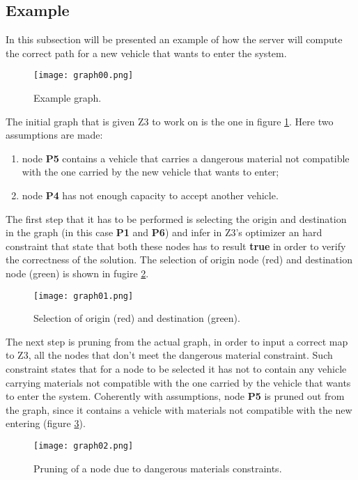 \subsection{Example}
In this subsection will be presented an example of how the server will compute the correct path for a new vehicle that wants to enter the system.
\begin{figure}[!htb]
   \centering
   \texttt{[image: graph00.png]}
   \caption{Example graph.}\label{Fig:Graph00}
\end{figure}
The initial graph that is given Z3 to work on is the one in figure \ref{Fig:Graph00}. Here two assumptions are made:
\begin{enumerate}
  \item node \textbf{P5} contains a vehicle that carries a dangerous material not compatible with the one carried by the new vehicle that wants to enter;
  \item node \textbf{P4} has not enough capacity to accept another vehicle.
\end{enumerate}
The first step that it has to be performed is selecting the origin and destination in the graph (in this case \textbf{P1} and \textbf{P6}) and infer in Z3's optimizer an hard constraint that state that both these nodes has to result \textbf{true} in order to verify the correctness of the solution. The selection of origin node (red) and destination node (green) is shown in fugire \ref{Fig:Graph01}.
\begin{figure}[!htb]
   \centering
   \texttt{[image: graph01.png]}
   \caption{Selection of origin (red) and destination (green).}\label{Fig:Graph01}
\end{figure}
The next step is pruning from the actual graph, in order to input a correct map to Z3, all the nodes that don't meet the dangerous material constraint. Such constraint states that for a node to be selected it has not to contain any vehicle carrying materials not compatible with the one carried by the vehicle that wants to enter the system. Coherently with assumptions, node \textbf{P5} is pruned out from the graph, since it contains a vehicle with materials not compatible with the new entering (figure \ref{Fig:Graph02}).
\begin{figure}[!htb]
   \centering
   \texttt{[image: graph02.png]}
   \caption{Pruning of a node due to dangerous materials constraints.}\label{Fig:Graph02}
\end{figure}

